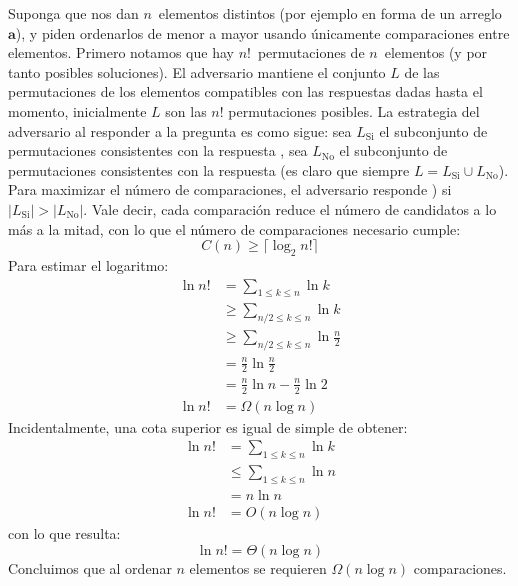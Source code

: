   Suponga que nos dan \(n\)~elementos distintos
  (por ejemplo en forma de un arreglo \(\mathbf{a}\)),
  y piden ordenarlos de menor a mayor
  usando únicamente comparaciones entre elementos.
  Primero notamos que hay \(n!\)~permutaciones de \(n\)~elementos
  (y por tanto posibles soluciones).
  El adversario mantiene el conjunto \(L\)
  de las permutaciones de los elementos
  compatibles con las respuestas dadas hasta el momento,
  inicialmente \(L\) son las \(n!\) permutaciones posibles.
  La estrategia del adversario
  al responder a la pregunta  es como sigue:
  sea \(L_{\text{Si}}\)
  el subconjunto de permutaciones consistentes con la respuesta ,
  sea \(L_{\text{No}}\)
  el subconjunto de permutaciones consistentes con la respuesta 
  (es claro que siempre \(L = L_{\text{Si}} \cup L_{\text{No}}\)).
  Para maximizar el número de comparaciones,
  el adversario responde )
  si \(\lvert L_{\text{Si}} \rvert > \lvert L_{\text{No}} \rvert\).
  Vale decir,
  cada comparación reduce el número de candidatos a lo más a la mitad,
  con lo que el número de comparaciones necesario cumple:
  \begin{equation*}
    C(n)
      \ge \lceil \log_2 n! \rceil
  \end{equation*}
  Para estimar el logaritmo:
  \begin{align*}
    \ln n!
      &=   \sum_{1 \le k \le n} \ln k \\
      &\ge \sum_{n / 2 \le k \le n} \ln k \\
      &\ge \sum_{n / 2 \le k \le n} \ln \frac{n}{2} \\
      &= \frac{n}{2} \ln \frac{n}{2} \\
      &= \frac{n}{2} \ln n - \frac{n}{2} \ln 2 \\
    \ln n!
      &= \Omega(n \log n)
  \end{align*}
  Incidentalmente,
  una cota superior es igual de simple de obtener:
  \begin{align*}
    \ln n!
      &= \sum_{1 \le k \le n} \ln k \\
      &\le \sum_{1 \le k \le n} \ln n \\
      &= n \ln n \\
    \ln n!
      &= O(n \log n)
  \end{align*}
  con lo que resulta:
  \begin{equation*}
    \ln n!
      = \Theta(n \log n)
  \end{equation*}
  Concluimos que al ordenar \(n\) elementos
  se requieren \(\Omega(n \log n)\) comparaciones.

